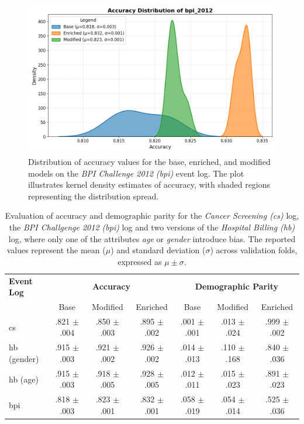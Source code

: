 \begin{figure}[h!]
    \centering
    \includegraphics[width=\imagewidth]{gfx/bpi_2012_accuracy.png}
    \caption{Distribution of accuracy values for the base, enriched,
    and modified models on the \textit{BPI Challenge 2012 (bpi)} event log.
    The plot illustrates kernel density estimates of accuracy, with shaded regions representing the distribution spread.}
    \label{fig:bpi_accuracy}
\end{figure}

\begin{table}[h!]
    \centering
    \scriptsize
    \renewcommand{\arraystretch}{1.2}
    \setlength{\tabcolsep}{6pt}
    \begin{tabularx}{\textwidth}{>{\centering\arraybackslash}m{1.7cm} | ccc | ccc}
        \toprule
        \textbf{Event Log} & \multicolumn{3}{c|}{\textbf{Accuracy}} & \multicolumn{3}{c}{\textbf{Demographic Parity}} \\
        & Base & Modified & Enriched & Base & Modified & Enriched \\
        \midrule
        cs &  .821 $\pm$ .004 &  .850 $\pm$ .003 &  .895 $\pm$ .002 &  .001 $\pm$ .001 &  .013 $\pm$ .024 &  .999 $\pm$ .002 \\
        hb (gender) &  .915 $\pm$ .003 &  .921 $\pm$ .002 &  .926 $\pm$ .002 &  .014 $\pm$ .013 &  .110 $\pm$ .168 &  .840 $\pm$ .036 \\
        hb (age) &  .915 $\pm$ .003 &  .918 $\pm$ .005 &  .928 $\pm$ .005 &  .012 $\pm$ .011 &  .015 $\pm$ .023 &  .891 $\pm$ .023 \\
        bpi &  .818 $\pm$ .003 &  .823 $\pm$ .001 &  .832 $\pm$ .001 &  .058 $\pm$ .019 &  .054 $\pm$ .014 &  .525 $\pm$ .036 \\
        \bottomrule
    \end{tabularx}
    \vspace{0.2cm} %
    \caption{Evaluation of accuracy and demographic parity for the \textit{Cancer Screening (cs)} log,
    the \textit{BPI Challgenge 2012 (bpi)} log and two versions of the \textit{Hospital Billing (hb)} log,
    where only one of the attributes \textit{age} or \textit{gender} introduce bias.
    The reported values represent the mean ($\mu$) and standard deviation ($\sigma$) across validation folds, expressed as $\mu \pm \sigma$.
    }
    \label{tab:evaluation_results}
\end{table}

